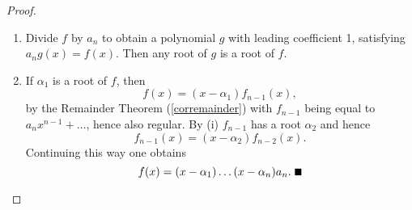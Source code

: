 \begin{proof}\begin{enumerate}
  \item 
Divide $f$ by $a_n$ to obtain a polynomial $g$ with leading
coefficient 1, satisfying $a_ng(x)=f(x)$. Then any root of $g$ is a
root of $f$.
\item If $\alpha_1$ is a root of $f$, then
$$f(x)=(x-\alpha_1)f_{n-1}(x),$$ 
by the Remainder Theorem (\ref{corremainder}) with $f_{n-1}$ being
equal to $a_nx^{n-1}+\ldots$, hence also 
regular. By (i) $f_{n-1}$ has a root $\alpha_2$ and hence
$$f_{n-1}(x)=(x-\alpha_2)f_{n-2}(x).$$
Continuing this way one obtains
$$f(x)=(x-\alpha_1)\ldots(x-\alpha_n)a_n.\qed$$
\end{enumerate}
\end{proof}



